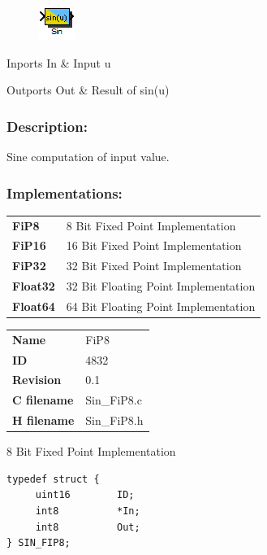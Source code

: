 \label{block:Sin}
\begin{figure}[H]\includegraphics{Sin}\end{figure} 

\begin{XtoCtabular}{Inports}
In & Input u\tabularnewline
\hline
\end{XtoCtabular}


\begin{XtoCtabular}{Outports}
Out & Result of sin(u)\tabularnewline
\hline
\end{XtoCtabular}

\subsubsection*{Description:}
Sine computation of input value.


\subsubsection*{Implementations:}
\begin{tabular}{l l}
\textbf{FiP8} & 8 Bit Fixed Point Implementation\tabularnewline
\textbf{FiP16} & 16 Bit Fixed Point Implementation\tabularnewline
\textbf{FiP32} & 32 Bit Fixed Point Implementation\tabularnewline
\textbf{Float32} & 32 Bit Floating Point Implementation\tabularnewline
\textbf{Float64} & 64 Bit Floating Point Implementation\tabularnewline
\end{tabular}

\nopagebreak[0]
\begin{tabular}{l l}
\textbf{Name} & FiP8 \tabularnewline
\textbf{ID} & 4832 \tabularnewline
\textbf{Revision} & 0.1 \tabularnewline
\textbf{C filename} & Sin\_FiP8.c \tabularnewline
\textbf{H filename} & Sin\_FiP8.h \tabularnewline
\end{tabular}
\vspace{1ex}

8 Bit Fixed Point Implementation

\begin{lstlisting}
typedef struct {
     uint16        ID;
     int8          *In;
     int8          Out;
} SIN_FIP8;
\end{lstlisting}

